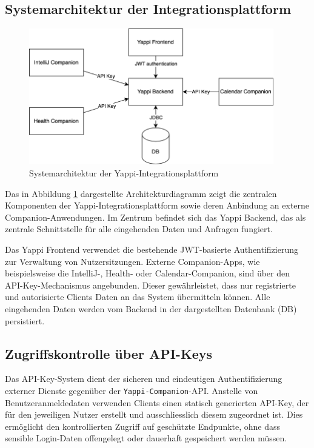 \documentclass[12pt,a4paper]{report}
\begin{document}
\subsection{Systemarchitektur der Integrationsplattform}

\begin{figure}[!htbp]
  \centering
  \includegraphics[width=0.95\textwidth]{../figures/plattform-system-diagram.drawio.png}
  \caption{Systemarchitektur der Yappi-Integrationsplattform}
  \label{fig:systemarchitektur}
\end{figure}

Das in Abbildung \ref{fig:systemarchitektur} dargestellte Architekturdiagramm zeigt die zentralen Komponenten der 
Yappi-Integrationsplattform sowie deren Anbindung an externe Companion-Anwendungen. Im Zentrum befindet sich das Yappi Backend,
das als zentrale Schnittstelle für alle eingehenden Daten und Anfragen fungiert.

Das Yappi Frontend verwendet die bestehende JWT-basierte Authentifizierung zur Verwaltung von Nutzersitzungen. Externe
Companion-Apps, wie beispielsweise die IntelliJ-, Health- oder Calendar-Companion, sind über den API-Key-Mechanismus angebunden.
Dieser gewährleistet, dass nur registrierte und autorisierte Clients Daten an das System übermitteln können. Alle eingehenden
Daten werden vom Backend in der dargestellten Datenbank (DB) persistiert.

\subsection{Zugriffskontrolle über API-Keys}

Das API-Key-System dient der sicheren und eindeutigen Authentifizierung externer Dienste gegenüber der \texttt{Yappi-Companion}-API.
Anstelle von Benutzeranmeldedaten verwenden Clients einen statisch generierten API-Key, der für den jeweiligen Nutzer erstellt und ausschliesslich diesem zugeordnet ist.
Dies ermöglicht den kontrollierten Zugriff auf geschützte Endpunkte, ohne dass sensible Login-Daten offengelegt oder dauerhaft gespeichert werden müssen.
\end{document}
